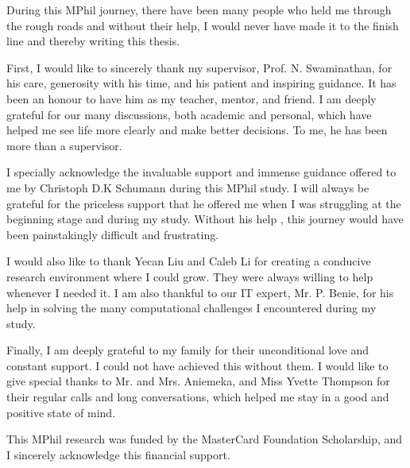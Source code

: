 
\begin{acknowledgements}      

During this MPhil journey, there have been many people
who held me through the rough roads and without their help, I would
never have made it to the finish line and thereby writing this thesis.
 
First, I would like to sincerely thank my supervisor, Prof. N. Swaminathan, for his care, generosity with his time, and his patient and inspiring guidance. It has been an honour to have him as my teacher, mentor, and friend. I am deeply grateful for our many discussions, both academic and personal, which have helped me see life more clearly and make better decisions. To me, he has been more than a supervisor.
 
I specially acknowledge the invaluable support and immense guidance offered to me by Christoph D.K Schumann  during this MPhil study.
I will always be grateful for the priceless support that he oﬀered me when I was struggling at the beginning stage and during my study.
Without his help , this journey would have been painstakingly difficult and frustrating.  
 
I would also like to thank Yecan Liu and Caleb Li for creating a conducive research environment where I could grow. They were always willing to help whenever I needed it. 
I am also thankful to our IT expert, Mr. P. Benie, for his help in solving the many computational challenges I encountered during my study.
 
 
Finally, I am deeply grateful to my family for their unconditional love and constant support. I could not have achieved this without them.
I would like to give special thanks to Mr. and Mrs. Aniemeka, and Miss Yvette Thompson for their regular calls and long conversations,
which helped me stay in a good and positive state of mind.
 
This MPhil research was funded by the MasterCard Foundation Scholarship, and I sincerely acknowledge this financial support.


\end{acknowledgements}
